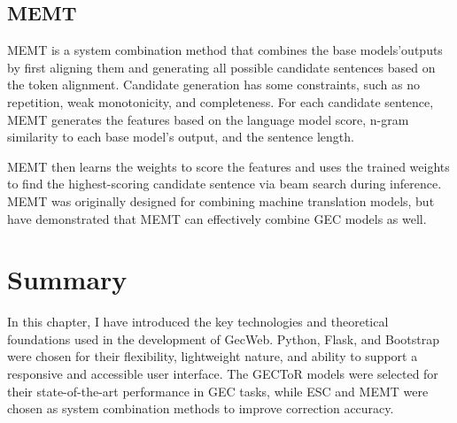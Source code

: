 \subsection{MEMT}
\label{memt}

MEMT is a system combination method that combines the base models'outputs by first aligning
them and generating all possible candidate sentences based on the token alignment.
Candidate generation has some constraints, such as no repetition, weak monotonicity, and completeness.
For each candidate sentence, MEMT generates the features based on the language model score, n-gram
similarity to each base model's output, and the sentence length.

MEMT then learns the weights to score the features and uses the trained weights to find the highest-scoring candidate sentence via beam search during inference.
MEMT was originally designed for combining machine translation models, but \cite{ng-etal-2014-conll} have demonstrated that MEMT can effectively combine GEC models as well.

\section{Summary}
\label{summary}

In this chapter, I have introduced the key technologies and theoretical foundations used in the development of GecWeb.
Python, Flask, and Bootstrap were chosen for their flexibility, lightweight nature, and ability to support a responsive and accessible user interface.
The GECToR models were selected for their state-of-the-art performance in GEC tasks, while ESC and MEMT were chosen as system combination methods to improve correction accuracy.
